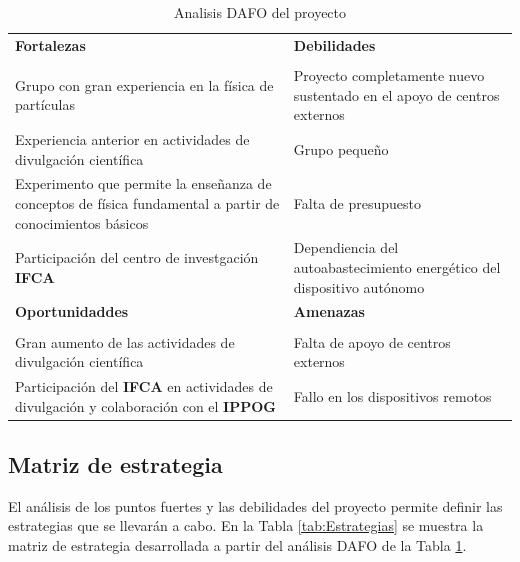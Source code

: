 \documentclass[11pt]{extarticle}
\begin{document}
					\begin{table}[H]
					    \centering
						\begin{tabular}{||m{7.0cm} | m{7.0cm}||}
							\hline \hline
							\multirow{1}{7.0cm}{\centering \Large \textbf{Fortalezas}} & \multirow{1}{7.0cm}{\centering \Large  \textbf{Debilidades}} \\
							& \\
							Grupo con gran experiencia en la física de partículas  & Proyecto completamente nuevo sustentado en el apoyo de centros externos\\
							Experiencia anterior en actividades de divulgación científica  & Grupo pequeño \\
							Experimento que permite la enseñanza de conceptos de física fundamental a partir de conocimientos básicos & Falta de presupuesto \\
							Participación del centro de investgación \textbf{IFCA} & Dependiencia del autoabastecimiento energético del dispositivo autónomo \\\hline
							\multirow{1}{7.0cm}{\centering \Large \textbf{Oportunidaddes}} & \multirow{1}{7.0cm}{\centering \Large \textbf{Amenazas}} \\
							& \\
							Gran aumento de las actividades de divulgación científica & Falta de apoyo de centros externos \\
							Participación del \textbf{IFCA} en actividades de divulgación y colaboración con el \textbf{IPPOG} & Fallo en los dispositivos remotos \\
							\hline \hline
					    \end{tabular}
					    \caption{\label{tab:Dafo} Analisis DAFO del proyecto}
					\end{table}

			\subsection{Matriz de estrategia}
				\label{SubSec:}

				El análisis de los puntos fuertes y las debilidades del proyecto permite definir las estrategias que se llevarán a cabo. En la Tabla \ref{tab:Estrategias} se muestra la matriz de estrategia desarrollada a partir del análisis DAFO de la Tabla \ref{tab:Dafo}.
\end{document}
